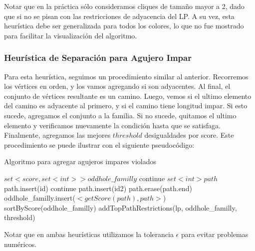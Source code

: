 Notar que en la práctica sólo consideramos cliques de tamaño mayor a 2, dado que si no se pisan con las restricciones de adyacencia del LP. A su vez, esta heurística debe ser generalizada para todos los colores, lo que no fue mostrado para facilitar la visualización del algoritmo.

\pagebreak

\subsubsection{Heurística de Separación para Agujero Impar}

Para esta heurística, seguimos un procedimiento similar al anterior. Recorremos los vértices en orden, y los vamos agregando si son adyacentes. Al final, el conjunto de vértices resultante es un camino. Luego, vemos si el ultimo elemento del camino es adyacente al primero, y si el camino tiene longitud impar. Si esto sucede, agregamos el conjunto a la familia. Si no sucede, quitamos el ultimo elemento y verificamos nuevamente la condición hasta que se satisfaga. Finalmente, agregamos las mejores $threshold$ desigualdades por score. Este procedimiento se puede ilustrar con el siguiente pseudocódigo:

\begin{algorithm}
\caption{Algoritmo para agregar agujeros impares violados}
\begin{algorithmic}[1]
\State $set<score, set<int>> oddhole\_familly$
		\State continue
	\EndIf
	\State $set<int> path$
	\State path.insert(id)
			\State continue
		\EndIf
			\State path.insert(id2)
		\EndIf
	\EndFor
		\State path.erase(path.end)
	\EndWhile
		\State oddhole\_familly.insert($<getScore(path), path>$)
	\EndIf
\EndFor
\State sortByScore(oddhole\_familly)
\State addTopPathRestrictions(lp, oddhole\_familly, threshold)

\EndProcedure
\end{algorithmic}
\end{algorithm}

Notar que en ambas heurísticas utilizamos la tolerancia $\epsilon$ para evitar problemas numéricos.

